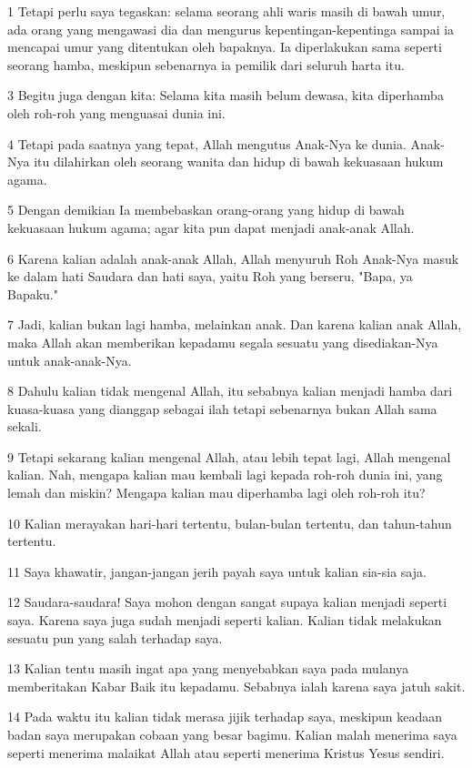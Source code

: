 \par 1 Tetapi perlu saya tegaskan: selama seorang ahli waris masih di bawah umur, ada orang yang mengawasi dia dan mengurus kepentingan-kepentinga sampai ia mencapai umur yang ditentukan oleh bapaknya. Ia diperlakukan sama seperti seorang hamba, meskipun sebenarnya ia pemilik dari seluruh harta itu.
\par 3 Begitu juga dengan kita: Selama kita masih belum dewasa, kita diperhamba oleh roh-roh yang menguasai dunia ini.
\par 4 Tetapi pada saatnya yang tepat, Allah mengutus Anak-Nya ke dunia. Anak-Nya itu dilahirkan oleh seorang wanita dan hidup di bawah kekuasaan hukum agama.
\par 5 Dengan demikian Ia membebaskan orang-orang yang hidup di bawah kekuasaan hukum agama; agar kita pun dapat menjadi anak-anak Allah.
\par 6 Karena kalian adalah anak-anak Allah, Allah menyuruh Roh Anak-Nya masuk ke dalam hati Saudara dan hati saya, yaitu Roh yang berseru, "Bapa, ya Bapaku."
\par 7 Jadi, kalian bukan lagi hamba, melainkan anak. Dan karena kalian anak Allah, maka Allah akan memberikan kepadamu segala sesuatu yang disediakan-Nya untuk anak-anak-Nya.
\par 8 Dahulu kalian tidak mengenal Allah, itu sebabnya kalian menjadi hamba dari kuasa-kuasa yang dianggap sebagai ilah tetapi sebenarnya bukan Allah sama sekali.
\par 9 Tetapi sekarang kalian mengenal Allah, atau lebih tepat lagi, Allah mengenal kalian. Nah, mengapa kalian mau kembali lagi kepada roh-roh dunia ini, yang lemah dan miskin? Mengapa kalian mau diperhamba lagi oleh roh-roh itu?
\par 10 Kalian merayakan hari-hari tertentu, bulan-bulan tertentu, dan tahun-tahun tertentu.
\par 11 Saya khawatir, jangan-jangan jerih payah saya untuk kalian sia-sia saja.
\par 12 Saudara-saudara! Saya mohon dengan sangat supaya kalian menjadi seperti saya. Karena saya juga sudah menjadi seperti kalian. Kalian tidak melakukan sesuatu pun yang salah terhadap saya.
\par 13 Kalian tentu masih ingat apa yang menyebabkan saya pada mulanya memberitakan Kabar Baik itu kepadamu. Sebabnya ialah karena saya jatuh sakit.
\par 14 Pada waktu itu kalian tidak merasa jijik terhadap saya, meskipun keadaan badan saya merupakan cobaan yang besar bagimu. Kalian malah menerima saya seperti menerima malaikat Allah atau seperti menerima Kristus Yesus sendiri.
